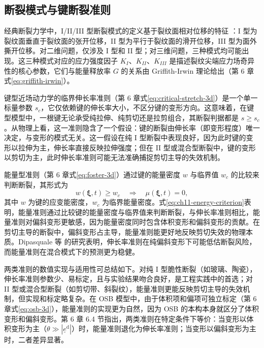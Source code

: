 \subsection{断裂模式与键断裂准则}\label{sec:ch11-fracture-modes}

经典断裂力学中，I/II/III 型断裂模式的定义基于裂纹面相对位移的特征 \cite{Irwin1957}：I 型为裂纹面垂直于裂纹面的张开位移，II 型为平行于裂纹面的滑开位移，III 型为面外撕开位移。对二维问题，仅涉及 I 型和 II 型；对三维问题，三种模式均可能出现。这三种模式对应的应力强度因子 $K_I$、$K_{II}$、$K_{III}$ 是描述裂纹尖端应力场奇异性的核心参数，它们与能量释放率 $G$ 的关系由 Griffith-Irwin 理论给出（第 6 章式\eqref{eq:griffith-irwin}）。

键型近场动力学的临界伸长率准则（第 6 章式\eqref{eq:critical-stretch-3d}）是一个单一标量参数 $s_c$，它仅依赖键的伸长率大小，不区分键的变形方向。这意味着，在键型模型中，一根键无论承受纯拉伸、纯剪切还是拉剪组合，其断裂判据都是 $s\geq s_c$。从物理上看，这一准则隐含了一个假设：键的断裂由伸长率（即变形程度）唯一决定，与变形的模式无关。这一假设在纯 I 型断裂中表现良好，因为此时键的变形以拉伸为主，伸长率直接反映拉伸强度；但在 II 型或混合型断裂中，键的变形以剪切为主，此时伸长率准则可能无法准确捕捉剪切主导的失效机制。

能量型准则（第 6 章式\eqref{eq:foster-3d}）通过键的能量密度 $w$ 与临界值 $w_c$ 的比较来判断断裂，其形式为
\begin{equation}
w(\boldsymbol{\xi},t)\geq w_c\quad\Longrightarrow\quad\mu(\boldsymbol{\xi},t)=0,
\label{eq:ch11-energy-criterion}
\end{equation}
其中 $w$ 为键的应变能密度，$w_c$ 为临界能量密度。式\eqref{eq:ch11-energy-criterion}表明，能量准则通过比较键的能量密度与临界值来判断断裂，与伸长率准则相比，能量准则对偏斜变形更敏感，因为能量密度同时包含体积变形和偏斜变形的贡献。在剪切主导的断裂中，偏斜变形占主导，能量准则能更好地反映剪切失效的物理本质。Dipasquale 等 \cite{Dipasquale2017} 的研究表明，伸长率准则在纯偏斜变形下可能低估断裂风险，而能量准则在混合模式下的预测更为稳健。

两类准则的数值实现与适用性可总结如下。对纯 I 型脆性断裂（如玻璃、陶瓷），伸长率准则参数少、易标定，且与实验结果吻合良好，是工程实践中的首选；对 II 型或混合型断裂（如剪切带、斜裂纹），能量准则更能反映剪切主导的失效机制，但实现和标定略复杂。在 OSB 模型中，由于体积项和偏项可独立标定（第 6 章式\eqref{eq:osb-3d}），能量准则的实现更为自然，因为 OSB 的本构本身就区分了体积变形和偏斜变形。第 6 章 6.4 节指出，两类准则在特定条件下等价：当变形以体积变形为主（$\theta\gg |\underline{e}^{\mathrm{d}}|$）时，能量准则退化为伸长率准则；当变形以偏斜变形为主时，二者差异显著。

